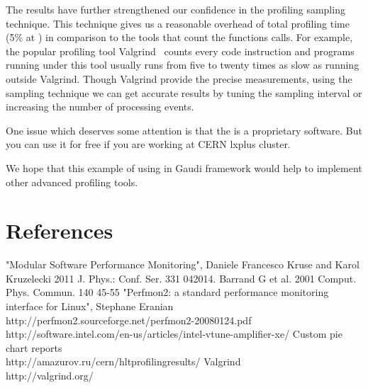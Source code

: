 \documentclass[a4paper]{jpconf}
\begin{document}
The results have further strengthened our confidence in the profiling sampling technique. This technique gives us 
a reasonable overhead of total profiling time (5\% at \iamp) in comparison to the tools that count the functions calls. 
For example, the popular profiling tool Valgrind~\cite{valgrind} counts every code instruction and programs running 
under this tool usually runs from five to twenty times as slow as running outside Valgrind. Though Valgrind provide 
the precise measurements, using the sampling technique we can get accurate results by tuning the sampling interval or 
increasing the number of processing events.

One issue  which deserves some attention is that the \iamp is a proprietary software. But you can use it for free 
if you are working at CERN lxplus cluster.

We hope that this example of using \iamp in  Gaudi framework would help to implement other advanced profiling tools.

\section*{References}
\begin{thebibliography}{9}
 "Modular Software Performance Monitoring",  Daniele Francesco Kruse and Karol Kruzelecki 2011 J. 
Phys.: Conf. Ser. 331 042014. 
 Barrand G et al. 2001 Comput. Phys. Commun. 140 45-55
 "Perfmon2: a standard performance monitoring interface for Linux", Stephane Eranian\\
http://perfmon2.sourceforge.net/perfmon2-20080124.pdf
 \iamp \\ http://software.intel.com/en-us/articles/intel-vtune-amplifier-xe/
 Custom pie chart reports \\ http://amazurov.ru/cern/hltprofilingresults/
 Valgrind \\ http://valgrind.org/
\end{thebibliography}
\end{document}
